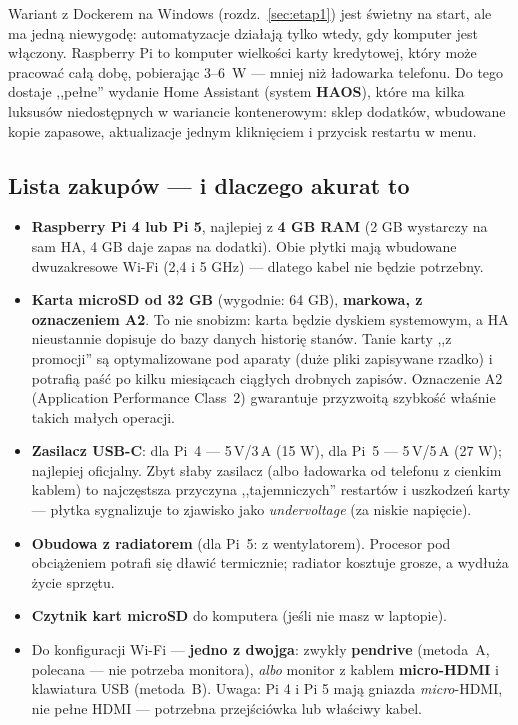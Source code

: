 \documentclass[11pt,a4paper]{article}
\begin{document}
Wariant z Dockerem na Windows (rozdz.~\ref{sec:etap1}) jest świetny na start, ale ma jedną niewygodę: automatyzacje działają tylko wtedy, gdy komputer jest włączony. Raspberry Pi to komputer wielkości karty kredytowej, który może pracować całą dobę, pobierając 3--6~W --- mniej niż ładowarka telefonu. Do tego dostaje ,,pełne'' wydanie Home Assistant (system \textbf{HAOS}), które ma kilka luksusów niedostępnych w wariancie kontenerowym: sklep dodatków, wbudowane kopie zapasowe, aktualizacje jednym kliknięciem i przycisk restartu w menu.

\subsection{Lista zakupów --- i dlaczego akurat to}

\begin{itemize}
\item \textbf{Raspberry Pi 4 lub Pi 5}, najlepiej z \textbf{4 GB RAM} (2 GB wystarczy na sam HA, 4 GB daje zapas na dodatki). Obie płytki mają wbudowane dwuzakresowe Wi-Fi (2,4 i 5 GHz) --- dlatego kabel nie będzie potrzebny.
\item \textbf{Karta microSD od 32 GB} (wygodnie: 64 GB), \textbf{markowa, z oznaczeniem A2}. To nie snobizm: karta będzie dyskiem systemowym, a HA nieustannie dopisuje do bazy danych historię stanów. Tanie karty ,,z promocji'' są optymalizowane pod aparaty (duże pliki zapisywane rzadko) i potrafią paść po kilku miesiącach ciągłych drobnych zapisów. Oznaczenie A2 (Application Performance Class~2) gwarantuje przyzwoitą szybkość właśnie takich małych operacji.
\item \textbf{Zasilacz USB-C}: dla Pi~4 --- 5\,V/3\,A (15 W), dla Pi~5 --- 5\,V/5\,A (27 W); najlepiej oficjalny. Zbyt słaby zasilacz (albo ładowarka od telefonu z cienkim kablem) to najczęstsza przyczyna ,,tajemniczych'' restartów i uszkodzeń karty --- płytka sygnalizuje to zjawisko jako \emph{undervoltage} (za niskie napięcie).
\item \textbf{Obudowa z radiatorem} (dla Pi~5: z wentylatorem). Procesor pod obciążeniem potrafi się dławić termicznie; radiator kosztuje grosze, a wydłuża życie sprzętu.
\item \textbf{Czytnik kart microSD} do komputera (jeśli nie masz w laptopie).
\item Do konfiguracji Wi-Fi --- \textbf{jedno z dwojga}: zwykły \textbf{pendrive} (metoda~A, polecana --- nie potrzeba monitora), \emph{albo} monitor z kablem \textbf{micro-HDMI} i klawiatura USB (metoda~B). Uwaga: Pi 4 i Pi 5 mają gniazda \emph{micro}-HDMI, nie pełne HDMI --- potrzebna przejściówka lub właściwy kabel.
\end{itemize}
\end{document}
